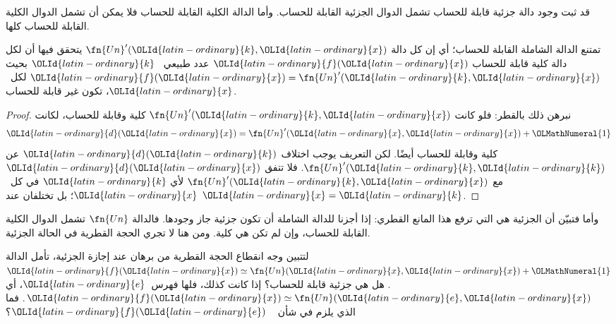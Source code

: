 \documentclass[../../../include/open-logic-section]{subfiles}
\begin{document}

قد ثبت وجود دالة جزئية قابلة للحساب تشمل الدوال الجزئية القابلة للحساب.
وأما الدالة الكلية القابلة للحساب فلا يمكن أن تشمل الدوال الكلية القابلة للحساب كلها.

\begin{thm}
تمتنع الدالة الشاملة القابلة للحساب؛ أي إن كل دالة
$\fn{Un}'(\OLId{latin-ordinary}{k},\OLId{latin-ordinary}{x})$ يتحقق فيها أن لكل دالة كلية قابلة للحساب $\OLId{latin-ordinary}{f}(\OLId{latin-ordinary}{x})$ عدد طبيعي
~$\OLId{latin-ordinary}{k}$ بحيث $\OLId{latin-ordinary}{f}(\OLId{latin-ordinary}{x})=\fn{Un}'(\OLId{latin-ordinary}{k},\OLId{latin-ordinary}{x})$ لكل~$\OLId{latin-ordinary}{x}$، تكون غير قابلة
للحساب.
\end{thm}

\begin{proof}
نبرهن ذلك بالقطر: فلو كانت $\fn{Un}'(\OLId{latin-ordinary}{k},\OLId{latin-ordinary}{x})$ كلية وقابلة للحساب،
لكانت
\[
\OLId{latin-ordinary}{d}(\OLId{latin-ordinary}{x}) = \fn{Un}'(\OLId{latin-ordinary}{x}, \OLId{latin-ordinary}{x}) + \OLMathNumeral{1}
\]
كلية وقابلة للحساب أيضًا. لكن التعريف يوجب اختلاف $\OLId{latin-ordinary}{d}(\OLId{latin-ordinary}{k})$ عن
$\fn{Un}'(\OLId{latin-ordinary}{k},\OLId{latin-ordinary}{k})$. فلا تتفق $\OLId{latin-ordinary}{d}(\OLId{latin-ordinary}{x})$ مع $\fn{Un}'(\OLId{latin-ordinary}{k},\OLId{latin-ordinary}{x})$ لأي
$\OLId{latin-ordinary}{k}$ في كل~$\OLId{latin-ordinary}{x}$؛ بل تختلفان عند $\OLId{latin-ordinary}{x}=\OLId{latin-ordinary}{k}$.
\end{proof}

\begin{explain}
وأما  فتبيّن أن الجزئية هي التي ترفع هذا
المانع القطري: إذا أجزنا للدالة الشاملة أن تكون جزئية جاز وجودها. فالدالة
$\fn{Un}$ تشمل الدوال الكلية القابلة للحساب، وإن لم تكن هي كلية. ومن هنا
لا تجري الحجة القطرية في الحالة الجزئية.
\end{explain}

\begin{prob}
  لتتبين وجه انقطاع الحجة القطرية من برهان  عند
  إجازة الجزئية، تأمل الدالة
  $\OLId{latin-ordinary}{f}(\OLId{latin-ordinary}{x})\simeq\fn{Un}(\OLId{latin-ordinary}{x},\OLId{latin-ordinary}{x})+\OLMathNumeral{1}$. هل هي جزئية قابلة للحساب؟ إذا كانت كذلك،
  فلها فهرس~$\OLId{latin-ordinary}{e}$، أي $\OLId{latin-ordinary}{f}(\OLId{latin-ordinary}{x})\simeq\fn{Un}(\OLId{latin-ordinary}{e},\OLId{latin-ordinary}{x})$. فما الذي يلزم في شأن
  ~ $\OLId{latin-ordinary}{f}(\OLId{latin-ordinary}{e})$؟
\end{prob}
\end{document}
